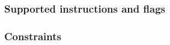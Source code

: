 \subsubsection{Supported instructions and flags}    \label{hub: instruction handling: btc: instructions}     
\subsubsection{Constraints          \lispDone{}}    \label{hub: instruction handling: btc: constraints}      
